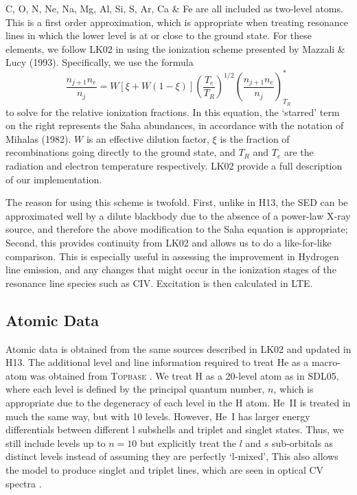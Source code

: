 \documentclass[preprint, a4paper, 11pt]{aastex}
\begin{document}
C, O, N, Ne, Na, Mg, Al, Si, S, Ar, Ca \& Fe are all included as two-level atoms. 
This is a first order approximation, which is appropriate 
when treating resonance lines in which the lower level is at or close to the 
ground state. 
For these elements, we follow LK02 in using the ionization scheme presented by Mazzali \& Lucy (1993). 
Specifically, we use the formula
\begin{equation}
\frac{n_{j+1} n_e}{n_j} = W [\xi + W(1-\xi)]
\left(\frac{T_e}{T_R}\right)^{1/2}
\left(\frac{n_{j+1}n_e}{n_j}\right)^*_{T_R} \label{ionization}
\end{equation}
to solve for the relative ionization fractions. In this equation, the `starred' term on 
the right represents the Saha abundances, in accordance with the notation of Mihalas (1982). 
$W$ is an effective dilution factor, $\xi$ is the
fraction of recombinations going directly to the ground state, and
$T_R$ and $T_e$ are the radiation and electron temperature
respectively. LK02 provide a full description of our implementation.

The reason for using this scheme 
is twofold. First, unlike in H13, the SED can be approximated well by a dilute blackbody due to the 
absence of a power-law X-ray source, and therefore the above modification to the Saha equation
is appropriate; Second, this provides continuity from LK02 and allows us to do a like-for-like comparison.
This is especially useful in assessing the improvement in Hydrogen line emission, and any changes
that might occur in the ionization stages of the resonance line species such as CIV. 
Excitation is then calculated in LTE. 



\subsection{Atomic Data}
Atomic data is obtained from the same sources described in LK02 and updated in H13. 
The additional level and line information required to treat He as a macro-atom was 
obtained from \textsc{Topbase} \citep{topbase2005}. We treat H as a 20-level atom as in SDL05, where 
each level is defined by the principal quantum number, $n$, which is appropriate due to
the degeneracy of each level in the H atom. He~\textsc{II} is treated in much the same way,
but with 10 levels. However, He~\textsc{I} has larger energy differentials between different l subshells
and triplet and singlet states. Thus, we still include levels up to $n=10$ but explicitly 
treat the $l$ and $s$ sub-orbitals as distinct levels instead of assuming they are perfectly `l-mixed',
This also allows the model to produce singlet and 
triplet lines, which are seen in optical CV spectra \citep[e.g.][]{dhillon1996}.
\end{document}
